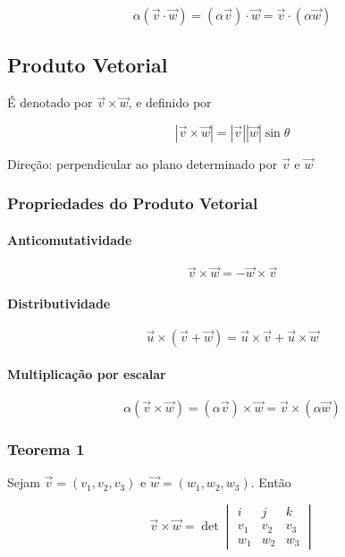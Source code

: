 \[
\alpha (\vec{v} \cdot \vec{w}) = (\alpha \vec{v}) \cdot \vec{w} = \vec{v} \cdot (\alpha \vec{w})
\]

\subsection{Produto Vetorial}\label{produto-vetorial}

É denotado por $\vec{v} \times \vec{w}$, e definido por

\[
|\vec{v} \times \vec{w}| = |\vec{v}| |\vec{w}| \sin \theta
\]

Direção: perpendicular ao plano determinado por $\vec{v}$ e $\vec{w}$

\subsubsection{Propriedades do Produto
Vetorial}\label{propriedades-do-produto-vetorial}

\paragraph{Anticomutatividade}\label{anticomutatividade}

\[
\vec{v} \times \vec{w} = - \vec{w} \times \vec{v}
\]

\paragraph{Distributividade}\label{distributividade-2}

\[
\vec{u} \times (\vec{v} + \vec{w}) = \vec{u} \times \vec{v} + \vec{u} \times \vec{w}
\]

\paragraph{Multiplicação por
escalar}\label{multiplicauxe7uxe3o-por-escalar-1}

\[
\alpha (\vec{v} \times \vec{w}) = (\alpha \vec{v}) \times \vec{w} = \vec{v} \times (\alpha \vec{w})
\]

\subsubsection{Teorema 1}\label{teorema-1}

Sejam $\vec{v} = (v_1, v_2, v_3)$ e $\vec{w} = (w_1, w_2, w_3)$. Então

\[
\vec{v} \times \vec{w}
= \det
\begin{vmatrix}
i & j & k \\
v_1 & v_2 & v_3 \\
w_1 & w_2 & w_3
\end{vmatrix}
\]
